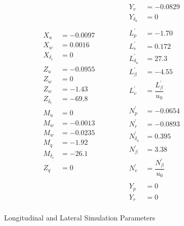 \documentclass[12pt]{article}
\begin{document}
\begin{figure}
\begin{equation*}
  \begin{split}
  X_u &= -0.0097 \\
  X_w &= 0.0016 \\
  X_{\delta_e} &= 0 \\
  \\
  Z_u &= -0.0955 \\
  Z_{\dot{w}} &= 0 \\
  Z_w &= -1.43 \\
  Z_{\delta_e} &= -69.8 \\
  \\
  M_u &= 0 \\
  M_{\dot{w}} &= -0.0013 \\
  M_w &= -0.0235 \\
  M_q &= -1.92 \\
  M_{\delta_e} &= -26.1 \\
  \\
  Z_q &= 0 \\
  \end{split}
\quad\quad
\quad\quad
  \begin{split}
  Y_v &= -0.0829 \\
  Y_{\delta_a} &= 0 \\
  \\
  L_p^\prime &= -1.70 \\
  L_r^\prime &= 0.172 \\
  L_{\delta_a}^\prime &= 27.3 \\
  L_{\beta}^\prime &= -4.55 \\
  L_v^\prime &= \dfrac{L_{\beta}^\prime}{u_0} \\
  \\
  N_p^\prime &= -0.0654 \\
  N_r^\prime &= -0.0893 \\
  N_{\delta_a}^\prime &= 0.395 \\
  N_{\beta}^\prime &= 3.38 \\
  N_v^\prime &= \dfrac{N_{\beta}^\prime}{u_0} \\
  \\
  Y_p &= 0 \\
  Y_r &= 0 \\
  \end{split}
\end{equation*}
  \caption{Longitudinal and Lateral Simulation Parameters}
\end{figure}
\end{document}
